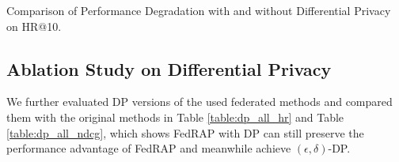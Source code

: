 \documentclass{article} %
\begin{document}
\begin{table}[!htbp]
\centering
\begin{minipage}[b]{0.49\linewidth}
    \centering
    \caption{
        Comparison of Performance Degradation with and without Differential Privacy on HR@10. 
    }
    \label{table:dp_all_hr}
\end{minipage}
\hfill
\begin{minipage}[b]{0.49\linewidth}
    \centering
    \caption{
        Comparison of Performance Degradation with and without Differential Privacy on NDCG@10. 
    }
    \label{table:dp_all_ndcg}
\end{minipage}
\end{table}

\subsection{Ablation Study on Differential Privacy}

We further evaluated DP versions of the used federated methods and compared them with the original methods in Table \ref{table:dp_all_hr} and Table \ref{table:dp_all_ndcg}, which shows FedRAP with DP can still preserve the performance advantage of FedRAP and meanwhile achieve $(\epsilon, \delta)$-DP.
\end{document}
